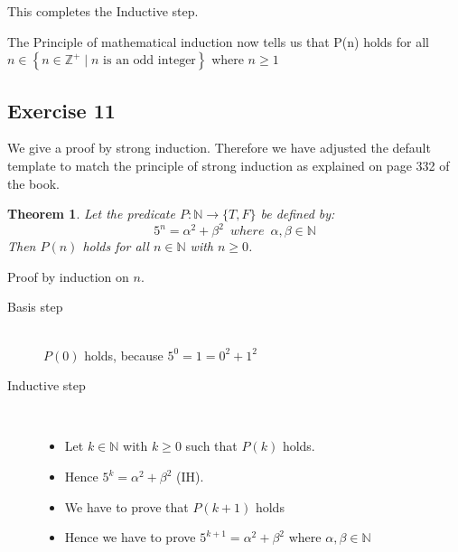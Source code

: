 \documentclass[a4paper]{article}
\newcommand{\exercise}[2]{\subsection*{Exercise #1}{#2}}
\newcommand{\set}[1]{\ensuremath{\left\{{#1}\right\}}}
\newcommand{\setbuild}[2]{\ensuremath{\set{{#1}\mid{#2}}}}
\newcommand{\NN}{\ensuremath{\mathbb{N}}}
\newcommand{\ZZp}{\ensuremath{\mathbb{Z}^{+}}}
\newtheorem{theorem}{Theorem}
\newcommand{\templtag}[1]{\marginpar{\fbox{#1}}}
\begin{document}
{\begin{description}
\begin{itemize}
\medskip
This \templtag{11}%
completes the Inductive step.
\end{itemize}
\end{description}

\medskip
The \templtag{12}%
Principle of mathematical induction now tells us that P(n) holds for all $n \in \setbuild{n\in \ZZp}{n \mbox{~is an odd integer} }$ where $n \geq 1$
}

\exercise{11}{%
We give a proof by strong induction.
Therefore we have adjusted the default template to match the principle of
strong induction as explained on page 332 of the book.

\setcounter{theorem}{10}%
\begin{theorem}
Let \templtag{1}%
the predicate $P: \NN \to \{T, F \}$ be defined by: \\
\[5^n = \alpha^2 + \beta^2 \enspace where \enspace \alpha, \beta \in \NN \]
Then $P(n)$ holds for all $n\in\NN$ with $n\geq 0$.
\end{theorem}

Proof \templtag{2}%
by induction on $n$.
\begin{description}
\item[Basis step]~\templtag{3}\\

\medskip %
$P(0)$ holds, \templtag{4}%
because $5^0 = 1 = 0^2 + 1^2$

\item[Inductive step]~\templtag{5}\\

\medskip
\begin{itemize}
\item
Let \templtag{6}%
$k\in\NN$ with $k\geq 0$ such that $P(k)$ holds.

\medskip
\item
Hence \templtag{7}%
$5^k = \alpha^2 + \beta^2$ (\mbox{IH}).

\medskip
\item
We \templtag{8}%
have to prove that $P(k + 1)$ holds

\medskip
\item
Hence \templtag{9}%
we have to prove
$5^{k+1} = \alpha^2 + \beta^2$ where $\alpha, \beta \in \NN$ \\


\end{itemize}
\end{description}}
\end{document}
